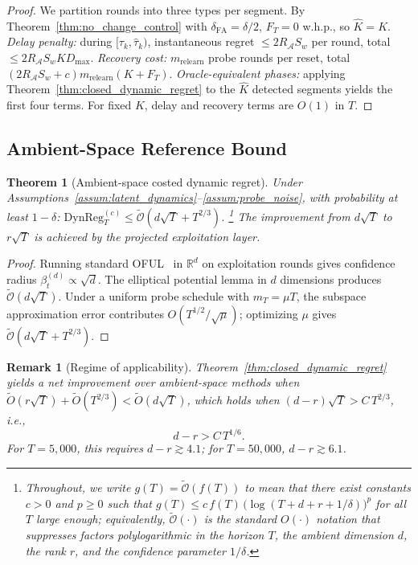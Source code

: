 \documentclass[11pt]{article}
\newcommand{\R}{\mathbb{R}}
\newcommand{\cA}{\mathcal{A}}
\newcommand{\tilO}{\widetilde{\mathcal{O}}}
\newcommand{\DynReg}{\mathrm{DynReg}}
\newtheorem{theorem}{Theorem}
\newtheorem{remark}{Remark}
\begin{document}
\begin{proof}
We partition rounds into three types per segment.
By Theorem~\ref{thm:no_change_control} with $\delta_{\mathrm{FA}}=\delta/2$,
$F_T=0$ w.h.p., so $\hat{K}=K$.
\emph{Delay penalty:} during $[\tau_k,\hat\tau_k)$, instantaneous regret
$\le 2R_{\cA}S_w$ per round, total $\le 2R_{\cA}S_wKD_{\max}$.
\emph{Recovery cost:} $m_{\mathrm{relearn}}$ probe rounds per reset, total
$(2R_{\cA}S_w{+}c)m_{\mathrm{relearn}}(K{+}F_T)$.
\emph{Oracle-equivalent phases:} applying
Theorem~\ref{thm:closed_dynamic_regret} to the $\hat{K}$ detected segments
yields the first four terms.
For fixed $K$, delay and recovery terms are $O(1)$ in $T$.
\end{proof}

\subsection{Ambient-Space Reference Bound}
\label{sec:ambient}

\begin{theorem}[Ambient-space costed dynamic regret]
\label{thm:ambient_regret}
Under Assumptions~\ref{assum:latent_dynamics}--\ref{assum:probe_noise},
with probability at least $1-\delta$:
$\DynReg_T^{(c)}\le\tilO(d\sqrt{T}+T^{2/3})$.%
\footnote{Throughout, we write $g(T)=\tilO(f(T))$ to mean that
there exist constants $c>0$ and $p\ge 0$ such that
$g(T)\le c\,f(T)\,\bigl(\log(T+d+r+1/\delta)\bigr)^{p}$ for all
$T$ large enough; equivalently, $\tilO(\cdot)$ is the standard $O(\cdot)$
notation that suppresses factors polylogarithmic in the horizon $T$,
the ambient dimension $d$, the rank $r$, and the confidence parameter
$1/\delta$.}
The improvement from $d\sqrt{T}$ to $r\sqrt{T}$ is achieved by the projected
exploitation layer.
\end{theorem}

\begin{proof}
Running standard OFUL~\citep{abbasi2011improved} in $\R^d$ on exploitation rounds
gives confidence radius $\beta_t^{(d)}\propto\sqrt{d}$.
The elliptical potential lemma in $d$ dimensions produces $\tilO(d\sqrt{T})$.
Under a uniform probe schedule with $m_T=\mu T$, the subspace approximation error
contributes $O(T^{1/2}/\sqrt{\mu})$; optimizing $\mu$ gives $\tilO(d\sqrt{T}+T^{2/3})$.
\end{proof}

\begin{remark}[Regime of applicability]
\label{rem:regime}
Theorem~\ref{thm:closed_dynamic_regret} yields a net improvement over ambient-space
methods when
$\widetilde{O}(r\sqrt{T})+\widetilde{O}(T^{2/3})
<\widetilde{O}(d\sqrt{T})$,
which holds when $(d{-}r)\sqrt{T}>C\,T^{2/3}$, i.e.,
\begin{equation}
  d-r > C\,T^{1/6}.
  \label{eq:regime_condition}
\end{equation}
For $T=5{,}000$, this requires $d-r\gtrsim 4.1$; for $T=50{,}000$,
$d-r\gtrsim 6.1$.
\end{remark}
\end{document}
